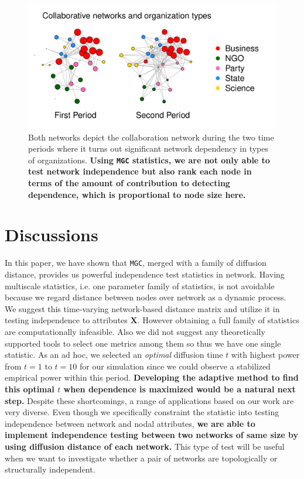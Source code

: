 \documentclass[12pt]{article}
\theoremstyle{definition}
\begin{document}
\begin{figure}[H]
	\centering
	\includegraphics[width=\linewidth]{../Figure/two_politics.pdf}
	\caption{Both networks depict the collaboration network during the two time periods where it turns out significant network dependency in types of organizations. \textbf{Using \texttt{MGC} statistics, we are not only able to test network independence but also rank each node in terms of the amount of contribution to detecting dependence, which is proportional to node size here.}}
	\label{fig:politics}
\end{figure}
	

\section{Discussions}
\label{sec:discussion}
	
In this paper, we have shown that \texttt{MGC}, merged with a family of diffusion distance, provides us powerful independence test statistics in network. Having multiscale statistics, i.e. one parameter family of statistics, is not avoidable because we regard distance between nodes over network as a dynamic process. We suggest this time-varying network-based distance matrix and utilize it in testing independence to attributes $\mathbf{X}$. However obtaining a full family of statistics are computationally infeasible. Also we did not suggest any theoretically supported tools to select one metrics among them so thus we have one single statistic. As an ad hoc, we selected an \textit{optimal} diffusion time $t$ with highest power from $t=1$ to $t=10$ for our simulation since we could observe a stabilized empirical power within this period. \textbf{Developing the adaptive method to find this optimal $t$ when dependence is maximized would be a natural next step.} Despite these shortcomings, a range of applications based on our work are very diverse. Even though we specifically constraint the statistic into testing independence between network and nodal attributes, \textbf{we are able to implement independence testing between two networks of same size by using diffusion distance of each network.} This type of test will be useful when we want to investigate whether a pair of networks are topologically or structurally independent. 
\end{document}
